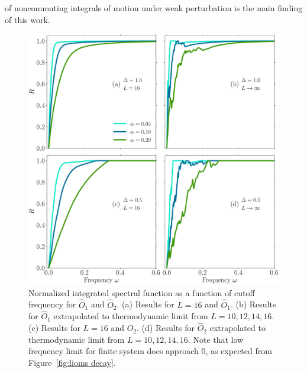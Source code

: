 of noncommuting integrals of motion under weak perturbation is the main finding of this work.
\begin{figure}[htbp]
  \centering
  \includegraphics[width=1.0\textwidth]{Figures/O12_no_scaling.pdf}
  \caption{Normalized integrated spectral function as a function of cutoff frequency for
  \(\hat{O}_1\) and \(\hat{O}_2\).
  (a) Results for \(L=16\) and \(\hat{O}_1\).  (b) Results for \(\hat{O}_1\) extrapolated to
  thermodynamic limit from \(L=10,12,14,16\). (c) Results for \(L=16\) and \(\hat{O}_2\). 
  (d) Results for \(\hat{O}_2\) extrapolated to thermodynamic limit from \(L=10,12,14,16\).
  Note that low frequency limit for finite system does approach \(0\), as expected from 
  Figure~\ref{fig:lioms decay}.
  }\label{fig:O12 no scaling}
\end{figure}

